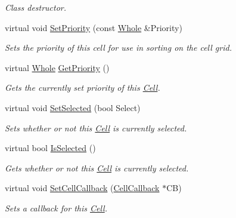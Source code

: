 \begin{DoxyCompactItemize}
\begin{DoxyCompactList}\small\item\em Class destructor. \item\end{DoxyCompactList}\item 
virtual void \hyperlink{classphys_1_1UI_1_1Cell_a886778f945fc31bdc118d101d67f9f80}{SetPriority} (const \hyperlink{namespacephys_a460f6bc24c8dd347b05e0366ae34f34a}{Whole} \&Priority)
\begin{DoxyCompactList}\small\item\em Sets the priority of this cell for use in sorting on the cell grid. \item\end{DoxyCompactList}\item 
virtual \hyperlink{namespacephys_a460f6bc24c8dd347b05e0366ae34f34a}{Whole} \hyperlink{classphys_1_1UI_1_1Cell_abb2a0c04c89df4a25cb5298c1a23e522}{GetPriority} ()
\begin{DoxyCompactList}\small\item\em Gets the currently set priority of this \hyperlink{classphys_1_1UI_1_1Cell}{Cell}. \item\end{DoxyCompactList}\item 
virtual void \hyperlink{classphys_1_1UI_1_1Cell_abb516a7a4fa2abe00ff037987beea745}{SetSelected} (bool Select)
\begin{DoxyCompactList}\small\item\em Sets whether or not this \hyperlink{classphys_1_1UI_1_1Cell}{Cell} is currently selected. \item\end{DoxyCompactList}\item 
virtual bool \hyperlink{classphys_1_1UI_1_1Cell_a5f7008c9177a44786215970a3f0849d3}{IsSelected} ()
\begin{DoxyCompactList}\small\item\em Gets whether or not this \hyperlink{classphys_1_1UI_1_1Cell}{Cell} is currently selected. \item\end{DoxyCompactList}\item 
virtual void \hyperlink{classphys_1_1UI_1_1Cell_a141d5642d251d102a3c87220b5c8607e}{SetCellCallback} (\hyperlink{classphys_1_1UI_1_1CellCallback}{CellCallback} $\ast$CB)
\begin{DoxyCompactList}\small\item\em Sets a callback for this \hyperlink{classphys_1_1UI_1_1Cell}{Cell}. \item\end{DoxyCompactList}\item 

\end{DoxyCompactItemize}
